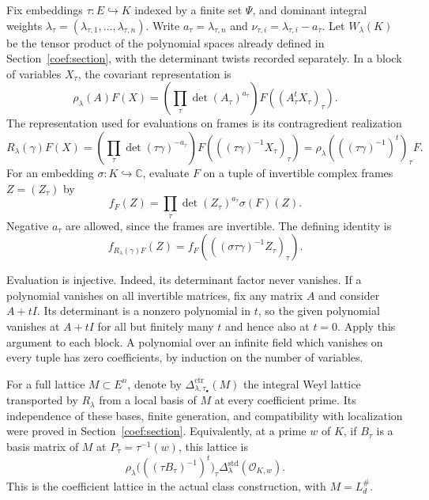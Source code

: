Fix embeddings $\tau:E\hookrightarrow K$ indexed by a finite
set $\Psi$, and dominant integral weights
$\lambda_\tau=(\lambda_{\tau,1},\ldots,\lambda_{\tau,n})$.
Write $a_\tau=\lambda_{\tau,n}$ and
$\nu_{\tau,i}=\lambda_{\tau,i}-a_\tau$. Let $W_\lambda(K)$
be the tensor product of the polynomial spaces already defined
in Section~\ref{coef:section}, with the determinant twists
recorded separately. In a block of variables $X_\tau$, the
covariant representation is
\[
 \rho_\lambda(A)F(X)
       =\left(\prod_\tau\det(A_\tau)^{a_\tau}\right)
                                         F((A_\tau^tX_\tau)_\tau).
\]
The representation used for evaluations on frames is its
contragredient realization
\begin{equation}\label{acl-contragredient}
 R_\lambda(\gamma)F(X)
    =\left(\prod_\tau\det(\tau\gamma)^{-a_\tau}\right)
                                  F(((\tau\gamma)^{-1}X_\tau)_\tau)
    =\rho_\lambda(((\tau\gamma)^{-1})^t)_\tau F.
\end{equation}
For an embedding $\sigma:K\hookrightarrow\mathbb C$, evaluate
$F$ on a tuple of invertible complex frames $Z=(Z_\tau)$ by
\begin{equation}\label{acl-evaluation}
               f_F(Z)=\prod_\tau\det(Z_\tau)^{a_\tau}
                                      \sigma(F)(Z).
\end{equation}
Negative $a_\tau$ are allowed, since the frames are invertible.
The defining identity is
\begin{equation}\label{acl-eval-action}
               f_{R_\lambda(\gamma)F}(Z)
                    =f_F(((\sigma\tau\gamma)^{-1}Z_\tau)_\tau).
\end{equation}

Evaluation is injective. Indeed, its determinant factor never
vanishes. If a polynomial vanishes on all invertible matrices,
fix any matrix $A$ and consider $A+tI$. Its determinant is a
nonzero polynomial in $t$, so the given polynomial vanishes
at $A+tI$ for all but finitely many $t$ and hence also at $t=0$.
Apply this argument to each block. A polynomial over an infinite
field which vanishes on every tuple has zero coefficients, by
induction on the number of variables.

For a full lattice $M\subset E^n$, denote by
$\Delta_{\lambda,\tau_\bullet}^{\mathrm{ctr}}(M)$ the
integral Weyl lattice transported by $R_\lambda$ from a local
basis of $M$ at every coefficient prime. Its independence of
these bases, finite generation, and compatibility with
localization were proved in Section~\ref{coef:section}.
Equivalently, at a prime $w$ of $K$, if $B_\tau$ is a basis
matrix of $M$ at $P_\tau=\tau^{-1}(w)$, this lattice is
\[
 \rho_\lambda\bigl(((\tau B_\tau)^{-1})^t\bigr)_\tau
                             \Delta_{\lambda}^{\mathrm{std}}(\mathcal O_{K,w}).
\]
This is the coefficient lattice in the actual class construction,
with $M=L_d^\#$.

